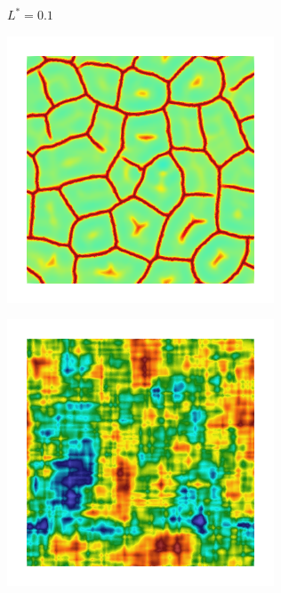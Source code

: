 \begin{figure}[!htbp]
\begin{subfigure}[b]{0.15\textwidth}
    \caption{$L^* = 0.1$}
    \label{fig: Chapter4/2D/psic_sqexp_cartesian_10_10_rho_0_seed_a}
  \end{subfigure}
  \begin{subfigure}[b]{0.15\textwidth}
    \includegraphics[width=\textwidth]{Chapter4/figures/2D/d_sqexp_cartesian_10_10_rho_0_seed_a.png}
    \caption{}
    \label{fig: Chapter4/2D/d_sqexp_cartesian_10_10_rho_0_seed_a}
  \end{subfigure}
  \begin{subfigure}[b]{0.15\textwidth}
    \includegraphics[width=\textwidth]{Chapter4/figures/2D/Gc_exp_cartesian_10_10_rho_0_seed_b.png}

\end{subfigure}
\end{figure}
